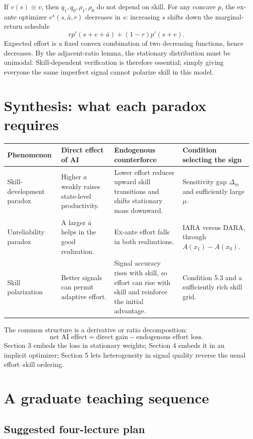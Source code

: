 \documentclass[11pt]{article}
\theoremstyle{tutorial}
\theoremstyle{remark}
\newcommand{\1}{\mathbb{I}}
\begin{document}
If $v(s)\equiv v$, then $q_1,q_0,\rho_1,\rho_0$ do not depend on skill.  For any concave $p$, the ex-ante
optimizer $e^\star(s,\bar a,r)$ decreases in $s$: increasing $s$ shifts down the marginal-return schedule
\[
r p'(s+e+\bar a)+(1-r)p'(s+e).
\]
Expected effort is a fixed convex combination of two decreasing functions, hence decreases.  By the
adjacent-ratio lemma, the stationary distribution must be unimodal.  Skill-dependent verification is
therefore essential; simply giving everyone the same imperfect signal cannot polarize skill in this model.

\section{Synthesis: what each paradox requires}

\begin{longtable}{p{}p{}p{}p{}}
\toprule
Phenomenon & Direct effect of AI & Endogenous counterforce & Condition selecting the sign\\
\midrule
\endhead
Skill-development paradox & Higher $a$ weakly raises state-level productivity. & Lower effort reduces
upward skill transitions and shifts stationary mass downward. & Sensitivity gap $\Delta_m$ and sufficiently
large $\mu$.\\
Unreliability paradox & A larger $\bar a$ helps in the good realization. & Ex-ante effort falls in both
realizations. & IARA versus DARA, through $A(x_1)-A(x_0)$.\\
Skill polarization & Better signals can permit adaptive effort. & Signal accuracy rises with skill, so effort
can rise with skill and reinforce the initial advantage. & Condition 5.3 and a sufficiently rich skill grid.\\
\bottomrule
\end{longtable}

The common structure is a derivative or ratio decomposition:
\[
\text{net AI effect}=\text{direct gain}-\text{endogenous effort loss}.
\]
Section 3 embeds the loss in stationary weights; Section 4 embeds it in an implicit optimizer; Section 5
lets heterogeneity in signal quality reverse the usual effort--skill ordering.

\section{A graduate teaching sequence}

\subsection{Suggested four-lecture plan}
\end{document}
